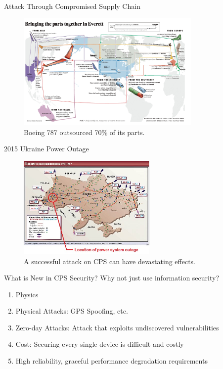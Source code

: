 \documentclass[10pt]{beamer}
\begin{document}
\begin{frame}{Attack Through Compromised Supply Chain}
  \begin{figure}[ht]
    \centering
    \includegraphics[width=0.8\textwidth]{boeing.jpg}
    \caption{Boeing 787 outsourced 70\% of its parts.}
  \end{figure}
\end{frame}

\begin{frame}{2015 Ukraine Power Outage}
  \begin{figure}[<+htpb+>]
    \begin{center}
      \includegraphics[width=0.60\textwidth]{ukraine.jpg}
      \caption{A successful attack on CPS can have devastating effects.}
    \end{center}
  \end{figure}
\end{frame}

\begin{frame}{What is New in CPS Security?}
  Why not just use information security?
  \begin{enumerate}
  \item Physics
  \item Physical Attacks: GPS Spoofing, etc.
  \item Zero-day Attacks: Attack that exploits undiscovered vulnerabilities
  \item Cost: Securing every single device is difficult and costly
  \item High reliability, graceful performance degradation requirements
  \end{enumerate}
\end{frame}
\end{document}
